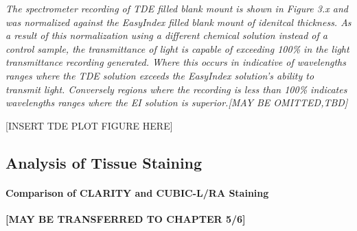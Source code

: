 \textit{The spectrometer recording of TDE filled blank mount is shown in Figure 3.x and was normalized against the EasyIndex filled blank mount of idenitcal thickness. As a result of this normalization using a different chemical solution instead of a control sample, the transmittance of light is capable of exceeding 100\% in the light transmittance recording generated. Where this occurs in indicative of wavelengths ranges where the TDE solution exceeds the EasyIndex solution's ability to transmit light. Conversely regions where the recording is less than 100\% indicates wavelengths ranges where the EI solution is superior.[MAY BE OMITTED,TBD]}

[INSERT TDE PLOT FIGURE HERE]



\subsection{Analysis of Tissue Staining}
\paragraph{Comparison of CLARITY and CUBIC-L/RA Staining}

\textbf{[MAY BE TRANSFERRED TO CHAPTER 5/6]}

